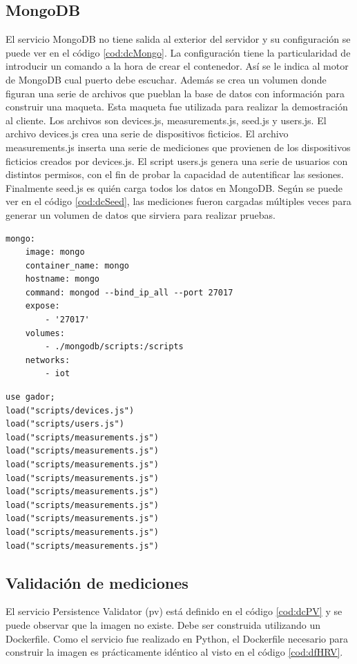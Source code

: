 \subsection{MongoDB}

El servicio MongoDB no tiene salida al exterior del servidor y su configuración se puede ver en el código \ref{cod:dcMongo}.
La configuración tiene la particularidad de introducir un comando a la hora de crear el contenedor.
Así se le indica al motor de MongoDB cual puerto debe escuchar.
Además se crea un volumen donde figuran una serie de archivos que pueblan la base de datos con información para construir una maqueta.
Esta maqueta fue utilizada para realizar la demostración al cliente.
Los archivos son devices.js, measurements.js, seed.js y users.js.
El archivo devices.js crea una serie de dispositivos ficticios.
El archivo measurements.js inserta una serie de mediciones que provienen de los dispositivos ficticios creados por devices.js.
El script users.js genera una serie de usuarios con distintos permisos, con el fin de probar la capacidad de autentificar las sesiones.
Finalmente seed.js es quién carga todos los datos en MongoDB.
Según se puede ver en el código \ref{cod:dcSeed}, las mediciones fueron cargadas múltiples veces para generar un volumen de datos que sirviera para realizar pruebas.

\begin{lstlisting}[label=cod:dcMongo,caption=Orquestación de MongoDB.]
mongo:
	image: mongo
	container_name: mongo
	hostname: mongo
	command: mongod --bind_ip_all --port 27017
	expose: 
		- '27017'
	volumes: 
		- ./mongodb/scripts:/scripts
	networks:
		- iot
\end{lstlisting}

\begin{lstlisting}[label=cod:dcSeed,caption=Seed de la base de datos.]
use gador;
load("scripts/devices.js")
load("scripts/users.js")
load("scripts/measurements.js")
load("scripts/measurements.js")
load("scripts/measurements.js")
load("scripts/measurements.js")
load("scripts/measurements.js")
load("scripts/measurements.js")
load("scripts/measurements.js")
load("scripts/measurements.js")
load("scripts/measurements.js")
\end{lstlisting}

\subsection{Validación de mediciones}

El servicio Persistence Validator (pv) está definido en el código \ref{cod:dcPV} y se puede observar que la imagen no existe.
Debe ser construida utilizando un Dockerfile.
Como el servicio fue realizado en Python, el Dockerfile necesario para construir la imagen es prácticamente idéntico al visto en el código \ref{cod:dfHRV}.

